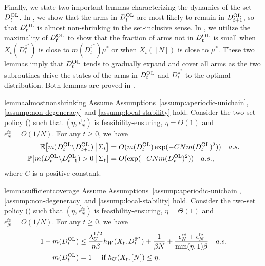 \documentclass[11pt,letterpaper]{article}
\theoremstyle{plain}
\theoremstyle{definition}
\theoremstyle{remark}
\newcommand{\Ebig}[1]{\mathbb{E}\big[#1\big]}
\newcommand{\givenbig}{\,\big|\,}
\newcommand{\Probbig}[1]{\mathbb{P}\big[#1\big]}
\newcommand{\pibar}{{\sysbar{\pi}}}
\newcommand{\pibs}{{\pibar^*}}
\newcommand{\sysbar}[1]{\bar{#1}}
\newcommand{\statdist}{\mu^*}
\newcommand{\wmat}{W}
\newcommand{\umat}{U}
\newcommand{\errfe}{\epsilon_N^{\text{fe}}}
\newcommand{\errtol}{\epsilon_N^{\text{rd}}}
\newcommand{\hw}{h_\wmat}
\newcommand{\hu}{h_\umat}
\newcommand{\lamu}{\lambda_\umat}
\newcommand{\Da}{D^{\pibs}}
\newcommand{\Db}{D^{\textup{OL}}}
\newcommand{\Fullstate}{\Sigma}
\begin{document}
Finally, we state two important lemmas characterizing the dynamics of the set $\Db_t$. In , we show that the arms in $\Db_t$ are most likely to remain in $\Db_{t+1}$, so that $\Db_t$ is almost non-shrinking in the set-inclusive sense.
In , we utilize the maximality of $\Db_t$ to show that the fraction of arms not in $\Db_t$ is small when $X_t(\Da_t)$ is close to $m(\Da_t)\statdist$ or when $X_t([N])$ is close to $\statdist$. 
These two lemmas imply that $\Db_t$ tends to gradually expand and cover all arms as the two subroutines drive the states of the arms in $\Db_t$ and $\Da_t$ to the optimal distribution. 
Both lemmas are proved in . 


\begin{restatable}{lemma}{almostnonshrinking}\label{lem:two-set:non-shrink}
    Assume Assumptions~\ref{assump:aperiodic-unichain}, \ref{assump:non-degeneracy} and \ref{assump:local-stability} hold. 
    Consider the two-set policy () such that $(\eta, \errfe)$ is feasibility-ensuring, $\eta=\Theta(1)$ and $\errfe=O(1/N)$. 
    For any $t\geq0$, we have
    \begin{align}
        \label{eq:two-set:non-shrink-drift}
        \Ebig{m(\Db_t\backslash \Db_{t+1}) \givenbig \Fullstate_t} &= O(m(\Db_t)\exp(-C N m(\Db_t)^2)) \quad a.s. \\
        \label{eq:two-set:non-shrink-high-prob}
        \Probbig{m(\Db_{t}\backslash \Db_{t+1}) > 0 \givenbig \Fullstate_t} &= O(\exp(-C N m(\Db_t)^2)) \quad a.s.,
    \end{align}
    where $C$ is a positive constant. 
\end{restatable}



\begin{restatable}{lemma}{sufficientcoverage}\label{lem:two-set:sufficient-coverage}
    Assume Assumptions~\ref{assump:aperiodic-unichain}, \ref{assump:non-degeneracy} and \ref{assump:local-stability} hold. 
    Consider the two-set policy () such that $(\eta, \errfe)$ is feasibility-ensuring, $\eta=\Theta(1)$ and $\errfe=O(1/N)$. 
    For any $t\geq0$, we have
    \begin{align}
        \label{eq:two-set:sufficient-coverage:goal-1}
        1-m(\Db_t) &\leq  \frac{\lamu^{1/2}}{\eta\beta}  \hw(X_t, \Da_t) + \frac{1}{\beta N} + \frac{\errtol+\errfe}{\min(\eta, 1)\beta} \quad a.s.\\
        \label{eq:two-set:sufficient-coverage:goal-2}
        m(\Db_t) &= 1 \quad \text{ if } \hu(X_t, [N]) \leq \eta. 
    \end{align}
\end{restatable}
\end{document}
